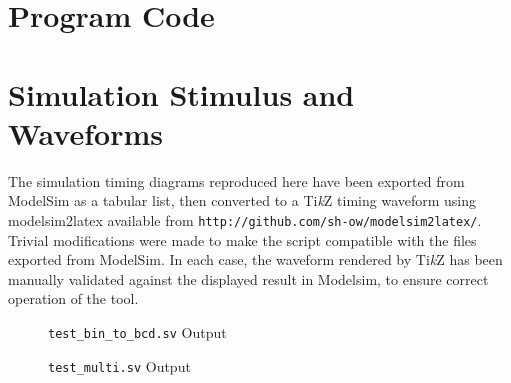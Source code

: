 \clearpage
\begin{appendices}
	
\section{Program Code} \label{app:prog-code}
	



\section{Simulation Stimulus and Waveforms} \label{app:sim-waveforms}

The simulation timing diagrams reproduced here have been exported from ModelSim as a tabular list, then converted to a Ti\textit{k}Z timing waveform using modelsim2latex available from \verb|http://github.com/sh-ow/modelsim2latex/|. Trivial modifications were made to make the script compatible with the files exported from ModelSim. In each case, the waveform rendered by Ti\textit{k}Z has been manually validated against the displayed result in Modelsim, to ensure correct operation of the tool.



\begin{figure}[ht]
	\centering
	
	\caption{\texttt{test\_bin\_to\_bcd.sv} Output}
	\label{fig:test-bin-bcd}
\end{figure}



\begin{figure}[ht]
	\centering
	
	\caption{\texttt{test\_multi.sv} Output}
	\label{fig:test-multi}
\end{figure}




\end{appendices}
